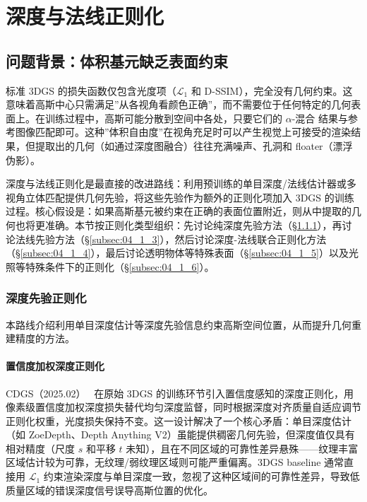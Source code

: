 \section{深度与法线正则化}
\label{sec:04_1}

\subsection{问题背景：体积基元缺乏表面约束}

标准 3DGS 的损失函数仅包含光度项（$\mathcal{L}_1$ 和 D-SSIM），完全没有几何约束。这意味着高斯中心只需满足”从各视角看颜色正确”，而不需要位于任何特定的几何表面上。在训练过程中，高斯可能分散到空间中各处，只要它们的 $\alpha$-混合 结果与参考图像匹配即可。这种”体积自由度”在视角充足时可以产生视觉上可接受的渲染结果，但提取出的几何（如通过深度图融合）往往充满噪声、孔洞和 floater（漂浮伪影）。

深度与法线正则化是最直接的改进路线：利用预训练的单目深度/法线估计器或多视角立体匹配提供几何先验，将这些先验作为额外的正则化项加入 3DGS 的训练过程。核心假设是：如果高斯基元被约束在正确的表面位置附近，则从中提取的几何也将更准确。本节按正则化类型组织：先讨论纯深度先验方法（\S\ref{subsec:04_1_2}），再讨论法线先验方法（\S\ref{subsec:04_1_3}），然后讨论深度-法线联合正则化方法（\S\ref{subsec:04_1_4}），最后讨论透明物体等特殊表面（\S\ref{subsec:04_1_5}）以及光照等特殊条件下的正则化（\S\ref{subsec:04_1_6}）。

\subsubsection{深度先验正则化}
\label{subsec:04_1_2}

本路线介绍利用单目深度估计等深度先验信息约束高斯空间位置，从而提升几何重建精度的方法。

\paragraph{置信度加权深度正则化}

CDGS（2025.02）~\cite{2502_14684} 在原始 3DGS 的训练环节引入置信度感知的深度正则化，用像素级置信度加权深度损失替代均匀深度监督，同时根据深度对齐质量自适应调节正则化权重，光度损失保持不变。这一设计解决了一个核心矛盾：单目深度估计（如 ZoeDepth、Depth Anything V2）虽能提供稠密几何先验，但深度值仅具有相对精度（尺度 $s$ 和平移 $t$ 未知），且在不同区域的可靠性差异悬殊——纹理丰富区域估计较为可靠，无纹理/弱纹理区域则可能严重偏离。3DGS baseline 通常直接用 $\mathcal{L}_1$ 约束渲染深度与单目深度一致，忽视了这种区域间的可靠性差异，导致低质量区域的错误深度信号误导高斯位置的优化。

